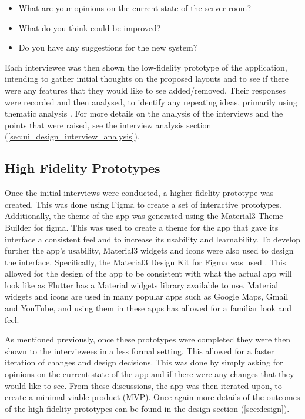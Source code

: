\documentclass [11pt,a4paper]{article}
\begin{document}
\begin{itemize}
    \item What are your opinions on the current state of the server room?
    \item What do you think could be improved?
    \item Do you have any suggestions for the new system?
\end{itemize}

Each interviewee was then shown the low-fidelity prototype of the application, intending to gather initial thoughts on the proposed layouts and to see if there were any features that they would like to see added/removed. Their responses were recorded and then analysed, to identify any repeating ideas, primarily using thematic analysis \cite{thematicAnal}. For more details on the analysis of the interviews and the points that were raised, see the interview analysis section (\ref{sec:ui_design_interview_analysis}).

\subsection{High Fidelity Prototypes}
\label{sec:high_fidelity_prototypes}
Once the initial interviews were conducted, a higher-fidelity prototype was created. This was done using Figma to create a set of interactive prototypes. Additionally, the theme of the app was generated using the Material3 Theme Builder for figma\cite{material3ColourTool}. This was used to create a theme for the app that gave its interface a consistent feel and to increase its usability and learnability. To develop further the app's usability, Material3 widgets and icons were also used to design the interface. Specifically, the Material3 Design Kit for Figma was used \cite{material3DesignKit}. This allowed for the design of the app to be consistent with what the actual app will look like as Flutter has a Material widgets library available to use. Material widgets and icons are used in many popular apps such as Google Maps, Gmail and YouTube, and using them in these apps has allowed for a familiar look and feel. 

As mentioned previously, once these prototypes were completed they were then shown to the interviewees in a less formal setting. This allowed for a faster iteration of changes and design decisions. This was done by simply asking for opinions on the current state of the app and if there were any changes that they would like to see. From these discussions, the app was then iterated upon, to create a minimal viable product (MVP). Once again more details of the outcomes of the high-fidelity prototypes can be found in the design section (\ref{sec:design}).
\end{document}
